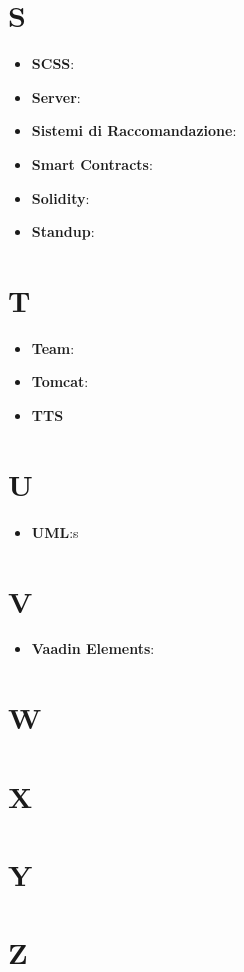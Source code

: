 \documentclass[a4paper, oneside, openany]{article}
\begin{document}
\section{S}
\begin{itemize}
\item \textbf{SCSS}:
\item \textbf{Server}:
\item \textbf{Sistemi di Raccomandazione}:
\item \textbf{Smart Contracts}:
\item \textbf{Solidity}:
\item \textbf{Standup}:
\end{itemize}

\section{T}
\begin{itemize}
\item \textbf{Team}:
\item \textbf{Tomcat}:
\item \textbf{TTS}
\end{itemize}

\section{U}
\begin{itemize}
\item \textbf{UML}:s
\end{itemize}

\section{V}
\begin{itemize}
\item \textbf{Vaadin Elements}:
\end{itemize}

\section{W}
\begin{itemize}

\end{itemize}

\section{X}
\begin{itemize}

\end{itemize}

\section{Y}

\section{Z}
\end{document}
